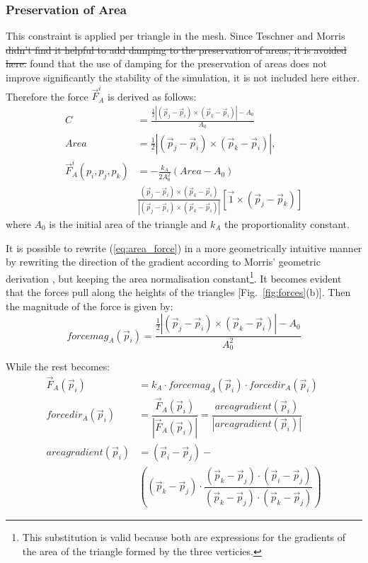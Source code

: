 \documentclass[journal]{IEEEtran}
\newcommand{\eref}[1]{(\ref{#1})}
\newcommand{\fref}[1]{Fig.~\ref{#1}}
\newcommand{\comment}[1]{{\color{red} #1}}
\begin{document}
\subsubsection{Preservation of Area}
This constraint is applied per triangle in the mesh.  Since Teschner and Morris \comment{\sout{didn't find it helpful to add damping to the preservation of areas, it is avoided here.} found that the use of damping for the preservation of areas does not improve significantly the stability of the simulation, it is not included here either.}  Therefore the force $\vec{F}^i_A$ is derived as follows:
\begin{align}
 C &= \frac{\frac{1}{2}|(\vec{p}_j-\vec{p}_i)\times(\vec{p}_k-\vec{p}_i)|-A_0}{A_0} \\
 Area &= \frac{1}{2}|(\vec{p}_j-\vec{p}_i)\times(\vec{p}_k-\vec{p}_i)|, \\
 \vec{F}^i_A(p_i,p_j,p_k) &= -\frac{k_A}{2A_0^2} \left( Area-A_0 \right) \nonumber \\
 & \frac{(\vec{p}_j-\vec{p}_i)\times(\vec{p}_k-\vec{p}_i)}{|(\vec{p}_j-\vec{p}_i)\times(\vec{p}_k-\vec{p}_i)|} [\vec{1} \times (\vec{p}_j-\vec{p}_k)] \label{eq:area_force}
\end{align}
where $A_0$ is the initial area of the triangle and $k_A$ the proportionality constant.

It is possible to rewrite \eref{eq:area_force} in a more geometrically intuitive manner by rewriting the direction of the gradient according to Morris' geometric derivation \cite{Morris2008}, but keeping the area normalisation constant\footnote{This substitution is valid because both are expressions for the gradients of the area of the triangle formed by the three verticies.}.  It becomes evident that the forces pull along the heights of the triangles [\fref{fig:forces}(b)].  Then the magnitude of the force is given by:
\begin{equation}
 forcemag_A(\vec{p}_i)= \frac{\frac{1}{2}|(\vec{p}_j-\vec{p}_i)\times(\vec{p}_k-\vec{p}_i)|-A_0}{A_0^2}
\end{equation}

While the rest becomes:
\begin{align}
 \vec{F}_A(\vec{p}_i) & = k_A \cdot forcemag_A(\vec{p}_i) \cdot forcedir_A(\vec{p}_i) \nonumber \\
 forcedir_A(\vec{p}_i) & = \dfrac{\vec{F}_A(\vec{p}_i)}{|\vec{F}_A(\vec{p}_i)|} = \dfrac{areagradient(\vec{p}_i)}{|areagradient(\vec{p}_i)|} \nonumber \\
 areagradient(\vec{p}_i) & = (\vec{p}_i-\vec{p}_j)- \nonumber \\
 & \left( (\vec{p}_k-\vec{p}_j) \cdot \dfrac{(\vec{p}_k-\vec{p}_j) \cdot (\vec{p}_i-\vec{p}_j)}{(\vec{p}_k-\vec{p}_j) \cdot (\vec{p}_k-\vec{p}_j)} \right)
\end{align}
\end{document}
